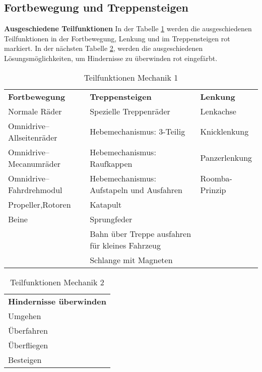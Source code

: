 \subsection*{Fortbewegung und Treppensteigen}
\textbf{Ausgeschiedene Teilfunktionen}
In der Tabelle \ref{tab:ausgeschiedene-teilfunktionen-fortbewegung} werden die ausgeschiedenen Teilfunktionen in der Fortbewegung, Lenkung und im Treppensteigen rot markiert. In der nächsten Tabelle \ref{tab:ausgeschiedene-teilfunktionen-hindernisse}, werden die ausgeschiedenen Lösungsmöglichkeiten, um Hindernisse zu überwinden rot eingefärbt. 
\begin{center}
\begin{table}[ht!]
    \begin{tabular}{l|l|l}
        \textbf{Fortbewegung} & \textbf{Treppensteigen} & \textbf{Lenkung} \\
        Normale Räder & Spezielle Treppenräder & Lenkachse \\
        Omnidrive–Allseitenräder & Hebemechanismus: 3-Teilig & Knicklenkung \\ 
        Omnidrive–Mecanumräder & Hebemechanismus: Raufkappen & Panzerlenkung \\
        Omnidrive–Fahrdrehmodul & Hebemechanismus: Aufstapeln und Ausfahren & Roomba-Prinzip \\
        \cellcolor{red}Propeller,Rotoren & \cellcolor{red}Katapult & \\
        Beine & Sprungfeder & \\
         & \cellcolor{red}Bahn über Treppe ausfahren für kleines Fahrzeug & \\ 
         & \cellcolor{red}Schlange mit Magneten & \\
    \end{tabular}
    \caption{Teilfunktionen Mechanik 1}
    \label{tab:ausgeschiedene-teilfunktionen-fortbewegung}
\end{table}\end{center}

\begin{center}
\begin{table}[h!]
    \begin{tabular}{l}
        \textbf{Hindernisse überwinden}\\
        Umgehen\\
        \cellcolor{red}Überfahren\\
        \cellcolor{red}Überfliegen\\
        \cellcolor{red}Besteigen\\
    \end{tabular}
    \caption{Teilfunktionen Mechanik 2}
    \label{tab:ausgeschiedene-teilfunktionen-hindernisse}
\end{table}
\end{center}

